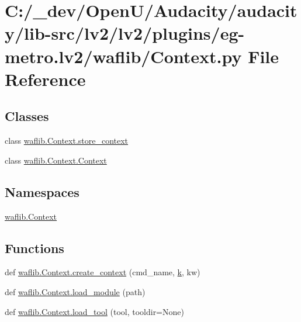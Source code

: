 \hypertarget{lv2_2plugins_2eg-metro_8lv2_2waflib_2_context_8py}{}\section{C\+:/\+\_\+dev/\+Open\+U/\+Audacity/audacity/lib-\/src/lv2/lv2/plugins/eg-\/metro.lv2/waflib/\+Context.py File Reference}
\label{lv2_2plugins_2eg-metro_8lv2_2waflib_2_context_8py}
\subsection*{Classes}
\begin{DoxyCompactItemize}
\item 
class \hyperlink{classwaflib_1_1_context_1_1store__context}{waflib.\+Context.\+store\+\_\+context}
\item 
class \hyperlink{classwaflib_1_1_context_1_1_context}{waflib.\+Context.\+Context}
\end{DoxyCompactItemize}
\subsection*{Namespaces}
\begin{DoxyCompactItemize}
\item 
 \hyperlink{namespacewaflib_1_1_context}{waflib.\+Context}
\end{DoxyCompactItemize}
\subsection*{Functions}
\begin{DoxyCompactItemize}
\item 
def \hyperlink{namespacewaflib_1_1_context_a224d64e5e44f9aae4903dc52235d6470}{waflib.\+Context.\+create\+\_\+context} (cmd\+\_\+name, \hyperlink{rfft2d_test_m_l_8m_adc468c70fb574ebd07287b38d0d0676d}{k}, kw)
\item 
def \hyperlink{namespacewaflib_1_1_context_ae0923656ff2aebede696050061d6d48d}{waflib.\+Context.\+load\+\_\+module} (path)
\item 
def \hyperlink{namespacewaflib_1_1_context_a2f9fe1693a40a8fa972154b9eeec3424}{waflib.\+Context.\+load\+\_\+tool} (tool, tooldir=None)
\end{DoxyCompactItemize}
